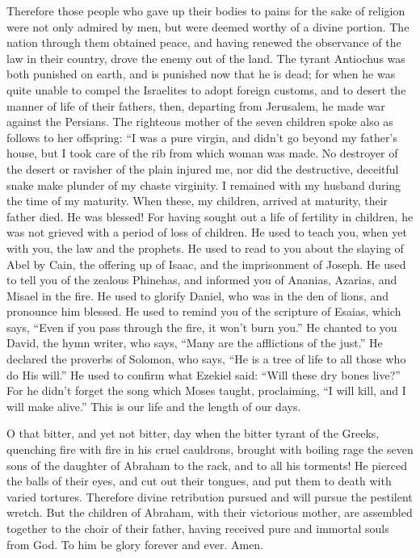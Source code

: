  Therefore those people who gave up their bodies to pains
for the sake of religion were not only admired by men, but were deemed
worthy of a divine portion.  The nation through them
obtained peace, and having renewed the observance of the law in their
country, drove the enemy out of the land.  The tyrant
Antiochus was both punished on earth, and is punished now that he is
dead; for when he was quite unable to compel the Israelites to adopt
foreign customs, and to desert the manner of life of their fathers,
 then, departing from Jerusalem, he made war against the
Persians.  The righteous mother of the seven children spoke
also as follows to her offspring: ``I was a pure virgin, and didn't go
beyond my father's house, but I took care of the rib from which woman
was made.  No destroyer of the desert or ravisher of the
plain injured me, nor did the destructive, deceitful snake make plunder
of my chaste virginity. I remained with my husband during the time of my
maturity.  When these, my children, arrived at maturity,
their father died. He was blessed! For having sought out a life of
fertility in children, he was not grieved with a period of loss of
children.  He used to teach you, when yet with you, the law
and the prophets.  He used to read to you about the slaying
of Abel by Cain, the offering up of Isaac, and the imprisonment of
Joseph.  He used to tell you of the zealous Phinehas, and
informed you of Ananias, Azarias, and Misael in the fire. 
He used to glorify Daniel, who was in the den of lions, and pronounce
him blessed.  He used to remind you of the scripture of
Esaias, which says, ``Even if you pass through the fire, it won't burn
you.''  He chanted to you David, the hymn writer, who says,
``Many are the afflictions of the just.''  He declared the
proverbs of Solomon, who says, ``He is a tree of life to all those who
do His will.''  He used to confirm what Ezekiel said:
``Will these dry bones live?''  For he didn't forget the
song which Moses taught, proclaiming, ``I will kill, and I will make
alive.''  This is our life and the length of our days.

 O that bitter, and yet not bitter, day when the bitter
tyrant of the Greeks, quenching fire with fire in his cruel cauldrons,
brought with boiling rage the seven sons of the daughter of Abraham to
the rack, and to all his torments!  He pierced the balls of
their eyes, and cut out their tongues, and put them to death with varied
tortures.  Therefore divine retribution pursued and will
pursue the pestilent wretch.  But the children of Abraham,
with their victorious mother, are assembled together to the choir of
their father, having received pure and immortal souls from God.
 To him be glory forever and ever. Amen.
